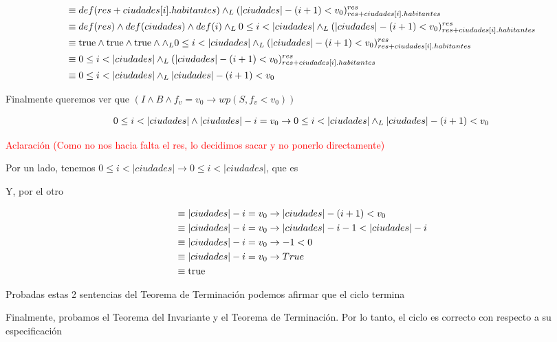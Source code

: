\documentclass[10pt,a4paper]{article}
\begin{document}
\begin {enumerate}
    \begin{align*}
        &\equiv def (res + ciudades[i].habitantes) \land _L (|ciudades| - (i + 1) < v_{0})_{res + ciudades[i].habitantes}^{res} \\
        &\equiv def(res) \land def(ciudades) \land def(i) \land _L 0 \leq i < |ciudades| \land _L (|ciudades| - (i + 1) < v_{0})_{res + ciudades[i].habitantes}^{res}\\
        &\equiv \mathrm{true} \land \mathrm{true} \land \mathrm{true} \land \land _L 0 \leq i < |ciudades| \land _L (|ciudades| - (i + 1) < v_{0})_{res + ciudades[i].habitantes}^{res}\\
        &\equiv 0 \leq i < |ciudades| \land _L (|ciudades| - (i + 1) < v_{0})_{res + ciudades[i].habitantes}^{res}\\
        &\equiv 0 \leq i < |ciudades| \land _L |ciudades| - (i + 1) < v_{0}
    \end{align*}

    Finalmente queremos ver que $(I \land B \land f_{v} = v_{0} \to wp(S, f_{v} < v_{0}))$


    \begin{align*}
        0 \leq i < |ciudades| \land |ciudades| - i = v_{0} \to 0 \leq i < |ciudades| \land _L |ciudades| - (i + 1) < v_{0}
    \end{align*}

    \textcolor{red}{Aclaración (Como no nos hacia falta el res, lo decidimos sacar y no ponerlo directamente)}

    Por un lado, tenemos $0 \leq i < |ciudades| \to 0 \leq i < |ciudades|$, que es \True

    Y, por el otro 

    \begin{align*}
        &\equiv |ciudades| - i = v_{0} \to |ciudades| - (i + 1) < v_{0} \\
        &\equiv |ciudades| - i = v_{0} \to |ciudades| - i - 1 < |ciudades| - i \\
        &\equiv |ciudades| - i = v_{0} \to - 1 < 0 \\
        &\equiv |ciudades| - i = v_{0} \to True \\
        &\equiv \mathrm{true}   
    \end{align*}

    Probadas estas 2 sentencias del Teorema de  Terminación podemos afirmar que el ciclo termina

    Finalmente, probamos el Teorema del Invariante y el Teorema de Terminación. Por lo tanto, el ciclo es correcto con respecto a su especificación


\end{enumerate}
\end{document}
